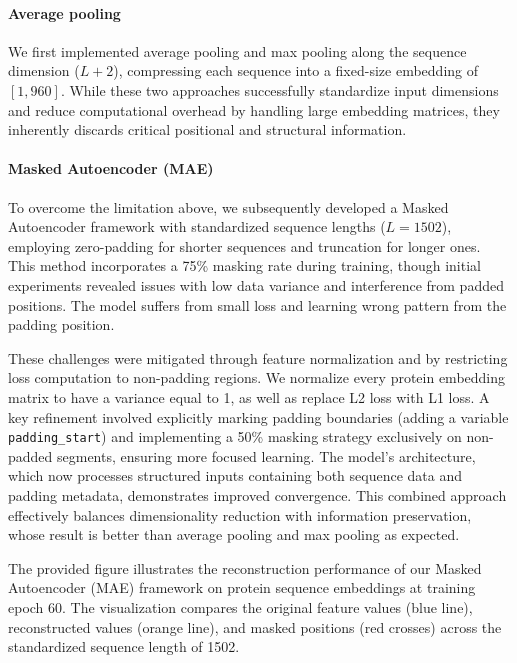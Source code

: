 \documentclass{article}
\begin{document}
	\paragraph{Average pooling} We first implemented {average pooling} and {max pooling} along the sequence dimension ($L+2$), compressing each sequence into a fixed-size embedding of $[1, 960]$. While these two approaches successfully standardize input dimensions and reduce computational overhead by handling large embedding matrices, they inherently discards critical positional and structural information.
	
	\paragraph{Masked Autoencoder (MAE)} To overcome the limitation above, we subsequently developed a {Masked Autoencoder} framework with standardized sequence lengths ($L = 1502$), employing zero-padding for shorter sequences and truncation for longer ones. 
	This method incorporates a 75\% masking rate during training, though initial experiments revealed issues with low data variance and interference from padded positions. The model suffers from small loss and learning wrong pattern from the padding position.
	
	 These challenges were mitigated through feature normalization and by restricting loss computation to non-padding regions. We normalize every protein embedding matrix to have a variance equal to 1, as well as replace L2 loss with L1 loss. A key refinement involved explicitly marking padding boundaries (adding a variable \texttt{padding\_start}) and implementing a 50\% masking strategy exclusively on non-padded segments, ensuring more focused learning. The model's architecture, which now processes structured inputs containing both sequence data and padding metadata, demonstrates improved convergence. This combined approach effectively balances dimensionality reduction with information preservation, whose result is better than average pooling and max pooling as expected.
	
The provided figure illustrates the reconstruction performance of our Masked Autoencoder (MAE) framework on protein sequence embeddings at training epoch 60. The visualization compares the original feature values (blue line), reconstructed values (orange line), and masked positions (red crosses) across the standardized sequence length of 1502.
\end{document}
